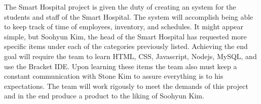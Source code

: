 The Smart Hospital project is given the duty of creating an system for the students and staff of the Smart Hospital. The system will accomplish being able to keep track of time of employees, inventory, and schedules. It might appear simple, but Soohyun Kim, the head of the Smart Hospital has requested more specific items under each of the categories previously listed. Achieving the end goal will require the team to learn HTML, CSS, Javascript, Nodejs, MySQL, and use the Bracket IDE. Upon learning these items the team also must keep a constant communication with Stone Kim to assure everything is to his expectations. The team will work rigously to meet the demands of this project and in the end produce a product to the liking of Soohyun Kim.